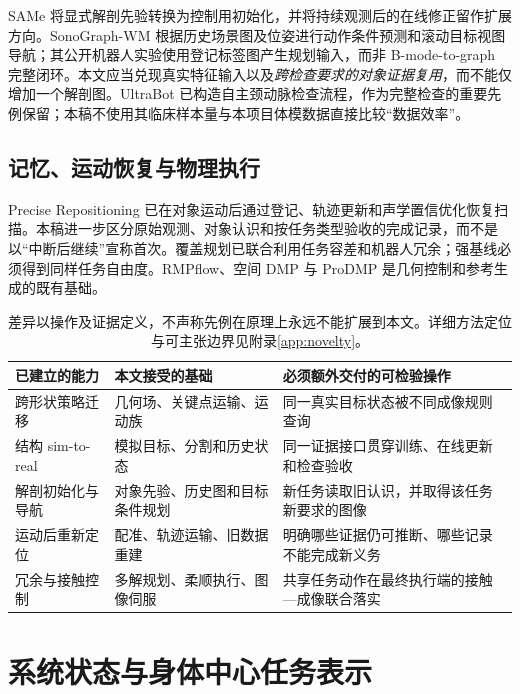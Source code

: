 \documentclass[UTF8,11pt,a4paper,fontset=fandol]{ctexart}
\numberwithin{equation}{section}
\theoremstyle{definition}
\begin{document}
SAMe 将显式解剖先验转换为控制用初始化，并将持续观测后的在线修正留作扩展方向\cite{same}。SonoGraph-WM 根据历史场景图及位姿进行动作条件预测和滚动目标视图导航；其公开机器人实验使用登记标签图产生规划输入，而非 B-mode-to-graph 完整闭环\cite{sonograph}。本文应当兑现真实特征输入以及\emph{跨检查要求的对象证据复用}，而不能仅增加一个解剖图。UltraBot 已构造自主颈动脉检查流程，作为完整检查的重要先例保留\cite{ultrabot}；本稿不使用其临床样本量与本项目体模数据直接比较“数据效率”。

\subsection{记忆、运动恢复与物理执行}
Precise Repositioning 已在对象运动后通过登记、轨迹更新和声学置信优化恢复扫描\cite{reposition}。本稿进一步区分原始观测、对象认识和按任务类型验收的完成记录，而不是以“中断后继续”宣称首次。覆盖规划已联合利用任务容差和机器人冗余\cite{coverageplan}；强基线必须得到同样任务自由度。RMPflow、空间 DMP 与 ProDMP 是几何控制和参考生成的既有基础\cite{rmpflow,aldmp,prodmp}。

\begin{table}[htbp]\centering\small
\begin{tabularx}{\linewidth}{P{29mm}YY}
\toprule
已建立的能力 & 本文接受的基础 & 必须额外交付的可检验操作\\\midrule
跨形状策略迁移 & 几何场、关键点运输、运动族 & 同一真实目标状态被不同成像规则查询\\
结构 sim-to-real & 模拟目标、分割和历史状态 & 同一证据接口贯穿训练、在线更新和检查验收\\
解剖初始化与导航 & 对象先验、历史图和目标条件规划 & 新任务读取旧认识，并取得该任务新要求的图像\\
运动后重新定位 & 配准、轨迹运输、旧数据重建 & 明确哪些证据仍可推断、哪些记录不能完成新义务\\
冗余与接触控制 & 多解规划、柔顺执行、图像伺服 & 共享任务动作在最终执行端的接触—成像联合落实\\\bottomrule
\end{tabularx}
\caption{差异以操作及证据定义，不声称先例在原理上永远不能扩展到本文。详细方法定位与可主张边界见附录\ref{app:novelty}。}
\end{table}

\section{系统状态与身体中心任务表示}
\label{sec:representation}
\end{document}
